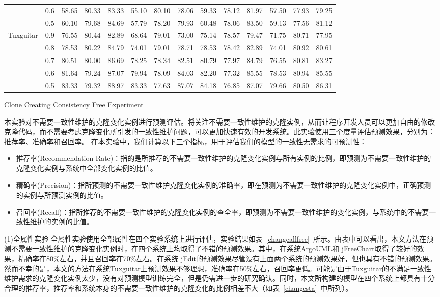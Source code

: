 \begin{sidewaystable}
\begin{tabular}{cccccccccccccc}
&0.6&	58.65&	80.33&	83.33&	55.10&	80.10&	78.06&	59.33&	78.12&	81.97&	57.50&	77.93&	79.25\\
&0.5&	60.10&	79.68&	84.69&	57.79&	78.20&	79.93&	60.48&	78.06&	83.50&	59.13&	77.56&	81.12\\
\hline
\multirow{5}{*}{Tuxguitar}
&0.9&	76.55&	80.44&	82.89&	68.64&	79.01&	73.00&	75.14&	78.57&	79.47&	71.75&	80.71&	77.95\\
&0.8&	78.53&	80.22&	84.79&	74.01&	79.01&	78.71&	78.53&	78.42&	82.89&	74.01&	80.92&	80.61\\
&0.7&	80.51&	80.00&	86.69&	78.25&	78.34&	82.51&	80.79&	77.97&	84.79&	76.55&	80.81&	83.27\\
&0.6&	81.64&	79.24&	87.07&	79.94&	78.09&	84.03&	82.20&	77.32&	85.55&	78.53&	80.94&	85.55\\
&0.5&	83.33&	79.32&	88.97&	83.33&	77.63&	87.07&	84.18&	76.85&	87.07&	79.66&	80.50&      86.31\\
\bottomrule[1.5pt]
\end{tabular}
\end{sidewaystable}

{Clone Creating Consistency Free Experiment}

本实验对不需要一致性维护的克隆变化实例进行预测评估。将关注不需要一致性维护的克隆实例，从而让程序开发人员可以更加自由的修改克隆代码，而不需要考虑克隆变化所引发的一致性维护问题，可以更加快速有效的开发系统。此实验使用三个度量评估预测效果，分别为：推荐率、准确率和召回率。
在本实验中，我们计算以下三个指标，用于评估我们的模型的一致性无需求的可预测性：

\begin{itemize}
\item 
推荐率(Recommendation Rate)：指的是所推荐的不需要一致性维护的克隆变化实例与所有实例的比例，即预测为不需要一致性维护的克隆变化实例与系统中全部变化实例的比值。
\item 
精确率(Precision)：指所预测的不需要一致性维护克隆变化实例的准确率，即在预测为不需要一致性维护的克隆变化实例中，正确预测的实例与所预测实例的比值。
\item  
召回率(Recall)：指所推荐的不需要一致性维护的克隆变化实例的查全率，即预测为不需要一致性维护的变化实例，与系统中的不需要一致性维护的实例的比值。
\end{itemize}


(1)全属性实验
全属性实验使用全部属性在四个实验系统上进行评估，实验结果如表~\ref{changeallfree}~所示。由表中可以看出，本文方法在预测不需要一致性维护的克隆变化实例时，在四个系统上均取得了不错的预测效果。其中，在系统ArgoUML和 jFreeChart取得了较好的效果，精确率在80\%左右，并且召回率在70\%左右。在系统 jEdit的预测效果尽管没有上面两个系统的预测效果好，但也具有不错的预测效果。然而不幸的是，本文的方法在系统Tuxguitar上预测效果不够理想，准确率在50\%左右，召回率更低。可能是由于Tuxguitar的不满足一致性维护需求的克隆变化实例太少，没有对预测模型训练完全，但是仍需进一步的研究确认。同时，本文所构建的模型在四个系统上都具有十分合理的推荐率，推荐率和系统本身的不需要一致性维护的克隆变化的比例相差不大（如表~\ref{changesta}~中所列）。

